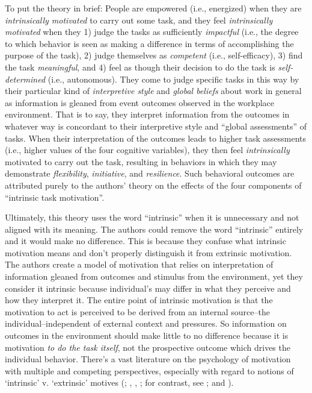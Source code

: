 \documentclass[
  11pt,
  a4paper,
]{article}
\begin{document}
To put the theory in brief: People are empowered (i.e., energized) when
they are \emph{intrinsically motivated} to carry out some task, and they
feel \emph{intrinsically motivated} when they 1) judge the tasks as
sufficiently \emph{impactful} (i.e., the degree to which behavior is
seen as making a difference in terms of accomplishing the purpose of the
task), 2) judge themselves as \emph{competent} (i.e., self-efficacy), 3)
find the task \emph{meaningful}, and 4) feel as though their decision to
do the task is \emph{self-determined} (i.e., autonomous). They come to
judge specific tasks in this way by their particular kind of
\emph{interpretive style} and \emph{global beliefs} about work in
general as information is gleaned from event outcomes observed in the
workplace environment. That is to say, they interpret information from
the outcomes in whatever way is concordant to their interpretive style
and ``global assessments'' of tasks. When their interpretation of the
outcomes leads to higher task assessments (i.e., higher values of the
four cognitive variables), they then feel \emph{intrinsically} motivated
to carry out the task, resulting in behaviors in which they may
demonstrate \emph{flexibility}, \emph{initiative}, and
\emph{resilience}. Such behavioral outcomes are attributed purely to the
authors' theory on the effects of the four components of ``intrinsic
task motivation''.

Ultimately, this theory uses the word ``intrinsic'' when it is
unnecessary and not aligned with its meaning. The authors could remove
the word ``intrinsic'' entirely and it would make no difference. This is
because they confuse what intrinsic motivation means and don't properly
distinguish it from extrinsic motivation. The authors create a model of
motivation that relies on interpretation of information gleaned from
outcomes and stimulus from the environment, yet they consider it
intrinsic because individual's may differ in what they perceive and how
they interpret it. The entire point of intrinsic motivation is that the
motivation to act is perceived to be derived from an internal
source--the individual--independent of external context and pressures.
So information on outcomes in the environment should make little to no
difference because it is motivation \emph{to do the task itself}, not
the prospective outcome which drives the individual behavior. There's a
vast literature on the psychology of motivation with multiple and
competing perspectives, especially with regard to notions of `intrinsic'
v. `extrinsic' motives (;
,
, ; for
contrast, see ; and
).
\end{document}
